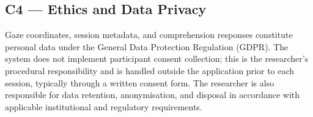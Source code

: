 \subsection*{C4 — Ethics and Data Privacy}

Gaze coordinates, session metadata, and comprehension responses constitute personal data under the General Data Protection Regulation (GDPR).
The system does not implement participant consent collection; this is the researcher's procedural responsibility and is handled outside the application prior to each session, typically through a written consent form.
The researcher is also responsible for data retention, anonymisation, and disposal in accordance with applicable institutional and regulatory requirements.
